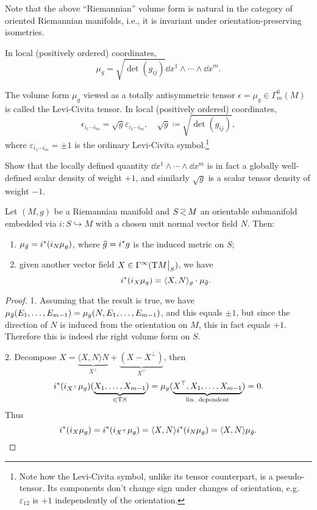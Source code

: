 Note that the above ``Riemannian'' volume form is natural in the category of oriented Riemannian manifolds, i.e., it is invariant under orientation-preserving isometries.

In local (positively ordered) coordinates, \[\mu_g=\sqrt{\det(g_{ij})}\dd x^1\wedge\cdots\wedge \dd x^m.\]

\begin{defn}
    The volume form $\mu_g$ viewed as a totally antisymmetric tensor $\epsilon=\mu_g\in\Gamma^0_m(M)$ is called the Levi-Civita tensor. In local (positively ordered) coordinates,
    \[\epsilon_{i_1\cdots i_m}=\sqrt g\varepsilon_{i_1\cdots i_m},\quad \sqrt g\coloneqq\sqrt{\det(g_{ij})},\]
    where $\varepsilon_{i_1\cdots i_m}=\pm 1$ is the ordinary Levi-Civita symbol.\footnote{Note how the Levi-Civita symbol, unlike its tensor counterpart, is a pseudo-tensor. Its components don't change sign under changes of orientation, e.g. $\varepsilon_{12}$ is $+1$ independently of the orientation.}
\end{defn}

\begin{xca}
    Show that the locally defined quantity $\dd x^1\wedge\cdots \wedge\dd x^m$ is in fact a globally well-defined scalar density of weight $+1$, and similarly  $\sqrt{g}$ is a scalar tensor density of weight $-1$.
\end{xca}

\begin{prop}
    Let $(M,g)$ be a Riemannian manifold and $S\emb M$ an orientable submanifold embedded via $i:S\hookrightarrow M$ with a chosen unit normal vector field $N$. Then:
    \begin{enumerate}
        \item $\mu_{\wt{g}}=i^\ast (i_N \mu_g)$, where $\wt{g}=i^\ast g$ is the induced metric on $S$;
        \item given another vector field $X\in\Gamma^\infty(\restr{\T M}{S})$, we have 
        \[i^\ast(i_X\mu_g)=\langle X,N\rangle_g \cdot \mu_{\wt{g}}.\]
    \end{enumerate}
\end{prop}
\begin{proof}
        1. Assuming that the result is true, we have $\mu_{\wt{g}}(E_1,\ldots,E_{m-1})=\mu_g(N,E_1,\ldots,E_{m-1})$, and this equals $\pm 1$, but since the direction of $N$ is induced from the orientation on $M$, this in fact equals $+1$. Therefore this is indeed rhe right volume form on $S$.
        
        2. Decompose $X=\underbrace{\langle X,N\rangle N}_{X^\perp}+\underbrace{(X-X^\perp)}_{X^\top}$,
        then 
        \[i^\ast(i_{X^\top}\mu_g)(\underbrace{X_1,\ldots,X_{m-1}}_{\in \mathrm{T} S})=\mu_g(\underbrace{X^\top,X_1,\ldots,X_{m-1}}_{\text{lin. dependent}})=0.\]
        Thus 
        \[i^\ast(i_X\mu_g)=i^\ast(i_{X^\top}\mu_g)=\langle X,N \rangle i^\ast (i_N \mu_g)=\langle X,N\rangle \mu_{\wt{g}}.\]
\end{proof}

